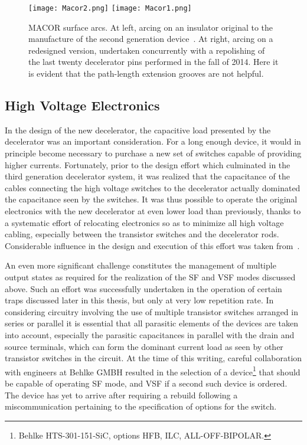 \begin{figure}[t!]
\centering
\texttt{[image: Macor2.png]}
\texttt{[image: Macor1.png]}
\caption[MACOR Surface Arcs]{\label{macorbad}
MACOR surface arcs. At left, arcing on an insulator original to the manufacture of the second generation device~\cite{Sawyer2007}. At right, arcing on a redesigned version, undertaken concurrently with a repolishing of the last twenty decelerator pins performed in the fall of 2014. Here it is evident that the path-length extension grooves are not helpful.}
\end{figure}

\subsection{High Voltage Electronics}

In the design of the new decelerator, the capacitive load presented by the decelerator was an important consideration.
For a long enough device, it would in principle become necessary to purchase a new set of switches capable of providing higher currents.
Fortunately, prior to the design effort which culminated in the third generation decelerator system, it was realized that the capacitance of the cables connecting the high voltage switches to the decelerator actually dominated the capacitance seen by the switches.
It was thus possible to operate the original electronics with the new decelerator at even lower load than previously, thanks to a systematic effort of relocating electronics so as to minimize all high voltage cabling, especially between the transistor switches and the decelerator rods.
Considerable influence in the design and execution of this effort was taken from~\citep[Fig.~4.6]{Scharfenberg2012}.

An even more significant challenge constitutes the management of multiple output states as required for the realization of the SF and VSF modes discussed above. 
Such an effort was successfully undertaken in the operation of certain traps discussed later in this thesis, but only at very low repetition rate.
In considering circuitry involving the use of multiple transistor switches arranged in series or parallel it is essential that all parasitic elements of the devices are taken into account, especially the parasitic capacitances in parallel with the drain and source terminals, which can form the dominant current load as seen by other transistor switches in the circuit.
At the time of this writing, careful collaboration with engineers at Behlke GMBH resulted in the selection of a device\footnote{Behlke HTS-301-151-SiC, options HFB, ILC, ALL-OFF-BIPOLAR.} that should be capable of operating SF mode, and VSF if a second such device is ordered. 
The device has yet to arrive after requiring a rebuild following a miscommunication pertaining to the specification of options for the switch.

